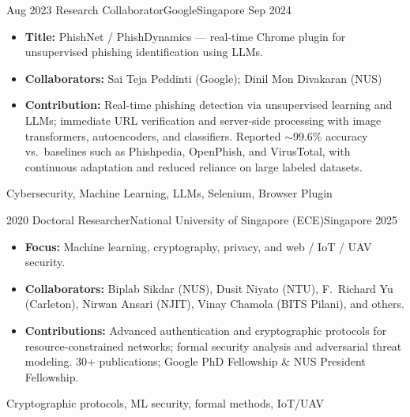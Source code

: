 \begin{experiences}
\emptySeparator

\experience
    {Aug 2023}   {Research Collaborator}{Google}{Singapore}
    {Sep 2024} {
                      \begin{itemize}
                       \item \textbf{Title:} PhishNet / PhishDynamics --- real-time Chrome plugin for unsupervised phishing identification using LLMs.
                       \item \textbf{Collaborators:} Sai Teja Peddinti (Google); Dinil Mon Divakaran (NUS)
                       \item \textbf{Contribution:} Real-time phishing detection via unsupervised learning and LLMs; immediate URL verification and server-side processing with image transformers, autoencoders, and classifiers. Reported $\sim$99.6\% accuracy vs.\ baselines such as Phishpedia, OpenPhish, and VirusTotal, with continuous adaptation and reduced reliance on large labeled datasets.
                      \end{itemize}
                    }
                    {Cybersecurity, Machine Learning, LLMs, Selenium, Browser Plugin}

\emptySeparator

\experience
    {2020} {Doctoral Researcher}{National University of Singapore (ECE)}{Singapore}
    {2025} {
                    \begin{itemize}
                       \item \textbf{Focus:} Machine learning, cryptography, privacy, and web / IoT / UAV security.
                       \item \textbf{Collaborators:} Biplab Sikdar (NUS), Dusit Niyato (NTU), F.\ Richard Yu (Carleton), Nirwan Ansari (NJIT), Vinay Chamola (BITS Pilani), and others.
                       \item \textbf{Contributions:} Advanced authentication and cryptographic protocols for resource-constrained networks; formal security analysis and adversarial threat modeling. 30+ publications; Google PhD Fellowship \& NUS President Fellowship.
                      \end{itemize}
                    }
                    {Cryptographic protocols, ML security, formal methods, IoT/UAV}

\emptySeparator


\end{experiences}
